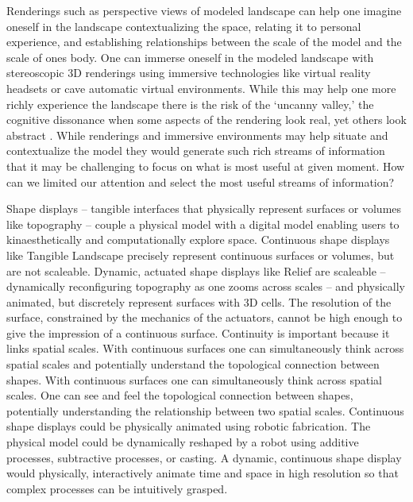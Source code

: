 \documentclass{article}
\begin{document}
Renderings such as perspective views of modeled landscape 
can help one imagine oneself in the landscape 
contextualizing the space,
relating it to personal experience,
and establishing relationships between the scale of the model and the scale of ones body. 
%
One can immerse oneself in the modeled landscape 
with stereoscopic 3D renderings 
using immersive technologies like virtual reality headsets 
or cave automatic virtual environments. 
%
While this may help one more richly experience the landscape
there is the risk of the `uncanny valley,' the cognitive dissonance 
when some aspects of the rendering look real, yet others look abstract \citep{Cafaro2014}. 
%
While renderings and immersive environments may help situate and contextualize the model
they would generate such rich streams of information 
that it may be challenging to focus on what is most useful at given moment. 
How can we limited our attention and select the most useful streams of information?

Shape displays -- tangible interfaces that physically represent surfaces or volumes like topography -- 
couple a physical model with a digital model
enabling users to kinaesthetically and computationally explore space. 
%
Continuous shape displays like Tangible Landscape precisely represent continuous surfaces or volumes, 
but are not scaleable. 
%
Dynamic, actuated shape displays like Relief \citep{Leithinger2010} are scaleable 
-- dynamically reconfiguring topography as one zooms across scales -- and physically animated, but discretely represent surfaces with 3D cells. The resolution of the surface, constrained by the mechanics of the actuators, cannot be high enough to give the impression of a continuous surface. 
%
Continuity is important because it links spatial scales. 
%
With continuous surfaces one can simultaneously think across spatial scales and potentially understand the topological connection between shapes.
%
With continuous surfaces one can simultaneously think across spatial scales.
One can see and feel the topological connection between shapes, 
potentially understanding the relationship between two spatial scales.
%
Continuous shape displays could be physically animated using robotic fabrication. 
The physical model could be dynamically reshaped by a robot 
using additive processes, subtractive processes, or casting. 
%
A dynamic, continuous shape display 
would physically, interactively animate time and space
in high resolution
so that complex processes can be intuitively grasped.
%








 
\end{document}
